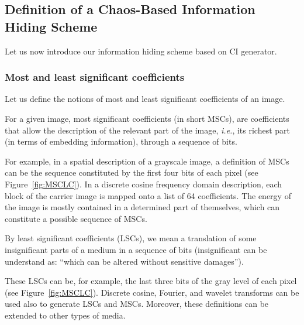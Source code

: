 \documentclass[journal]{IEEEtran}
\begin{document}
\subsection{Definition of a Chaos-Based Information Hiding Scheme}
\label{sec:Algo}

Let us now introduce our information hiding scheme based on CI generator.


\subsubsection{Most and least significant coefficients}

Let us define the notions of most and least significant coefficients of an image.

\begin{Definition}
\label{definitionMSC}
For a given image, most significant coefficients (in short MSCs), are coefficients that allow the description of the relevant part of the image, \emph{i.e.}, its richest part (in terms of embedding information), through a sequence of bits.
\end{Definition}

For example, in a spatial description of a grayscale image, a definition of MSCs can be the sequence constituted by the first four bits of each pixel (see Figure~\ref{fig:MSCLC}). In a discrete cosine frequency domain description, each  block of the carrier image is mapped onto a list of 64 coefficients. The energy of the image is mostly contained in a determined part of themselves, which can constitute a possible sequence of MSCs.

\begin{Definition}
\label{definitionLSC}
By least significant coefficients (LSCs), we mean a translation of some insignificant parts of a medium in a sequence of bits (insignificant can be understand as: ``which can be altered without sensitive damages'').
\end{Definition}

These LSCs can be, for example, the last three bits of the gray level of each pixel (see Figure~\ref{fig:MSCLC}). Discrete cosine, Fourier, and wavelet transforms can be used also to generate LSCs and MSCs. Moreover, these definitions can be extended to other types of media.
\end{document}
